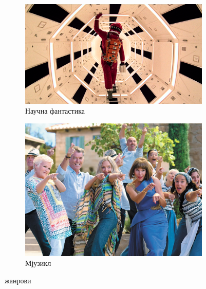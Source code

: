 \documentclass{article}
\begin{document}
\begin{figure}[htbp]
  \centering
  \begin{subfigure}{0.45\textwidth}
    \centering
    \includegraphics[width=\linewidth]{slike/odiseja.png} %
    \caption{Научна фантастика}
    \label{fig:slika7}
  \end{subfigure}
  \hfill
  \begin{subfigure}{0.45\textwidth}
    \centering
    \includegraphics[width=\linewidth]{slike/musical.jpg} %
    \caption{Мјузикл}
    \label{fig:slika8}
  \end{subfigure}
  \caption{жанрови}
  \label{fig:zajednicki_naslov3}
\end{figure}
\end{document}
